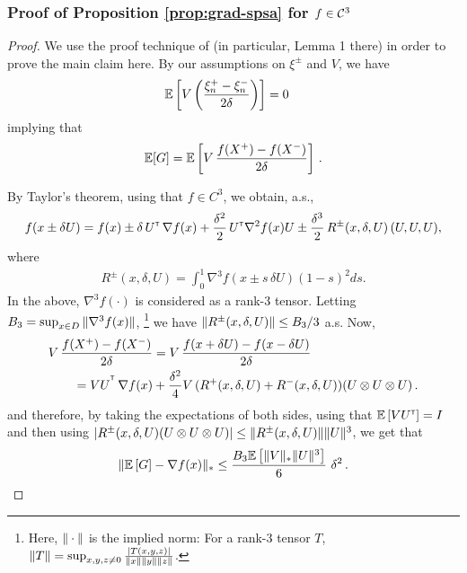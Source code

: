 \subsubsection*{Proof of Proposition \ref{prop:grad-spsa} for $f \in \mathcal{C}^3$}
\begin{proof}
We use the proof technique of \cite{spall1992multivariate} (in particular, Lemma 1 there) in order to prove the main claim here.
By our assumptions on $\xi^{\pm}$ and $V$,  we have
\begin{align*}
&\mathbb{E}\left[  V\left(\dfrac{\xi_n^+ - \xi_n^-}{2\delta}\right) \right]= 0
\end{align*}
implying that
\begin{align*}
\mathbb{E}[G] =  \mathbb{E}\left[V\,  \dfrac{f(X^+)  -f(X^-)}{2\delta} \right]\,.
\end{align*}

By Taylor's theorem, using that $f\in C^3$, we obtain, a.s.,
\begin{align*}
f(x \pm \delta U) =
 f(x)
 \pm\delta\,  U^\mathsf{\scriptscriptstyle T}\,\nabla f(x)
  + \frac{\delta^2}{2}\, U^\mathsf{\scriptscriptstyle T} \nabla^2 f(x) U
  \pm  \frac{\delta^3}{2} \, R^{\pm}(x,\delta,U) \,(U, U, U),
\end{align*}
where
\begin{align}
 R^{\pm}(x,\delta,U)= \int_0^1  \nabla^3 f(  x \pm s \, \delta U ) (1-s)^2 ds. \label{eq:taylor-r}
\end{align}
In the above, $\nabla^3 f(\cdot)$ is considered as a rank-3 tensor.
Letting $B_3 = \sup_{x\in D} \| \nabla^3 f(x) \|$,%
\footnote{Here, $\|\cdot\|$ is the implied norm: For a rank-3 tensor $T$, $\|T\| = \sup_{x,y,z\ne 0}
\frac{|T (x,y,z)|}{\|x\|\|y\|\|z\|}$.
}
we have $\| R^{\pm}(x,\delta,U)\| \le B_3/3$ a.s.
Now,
\begin{align}
\begin{split}
\MoveEqLeft       V\, \dfrac{f(X^+)-f(X^-)}{2\delta}
  = V\, \dfrac{f(x+\delta U) - f(x-\delta U)}{2\delta} \\
&= VU^{\tr}
\, \nabla f(x)   +   \frac{\delta^2}{4}  V \,(R^{+}(x,\delta,U)+R^{-}(x,\delta,U))(U \otimes U \otimes U)\,.
\end{split}
\label{eq:l1}
\end{align}
and therefore,
by taking the expectations of both sides,
using that $\mathbb{E}\left[V U^\mathsf{\scriptscriptstyle T}\right] = I$ and then using $|R^{\pm}(x,\delta,U) (U \otimes U \otimes U)| \le
\|R^{\pm}(x,\delta,U)\| \|U\|^3$,
we get that
\begin{align*}
\| \mathbb{E}\left[ G \right] - \nabla f(x) \|_*
\le \frac{B_3 \mathbb{E}\left[ \|V\|_* \|U\|^3 \right]}{6}\,\, \delta^2 \,.
\end{align*}


\end{proof}
